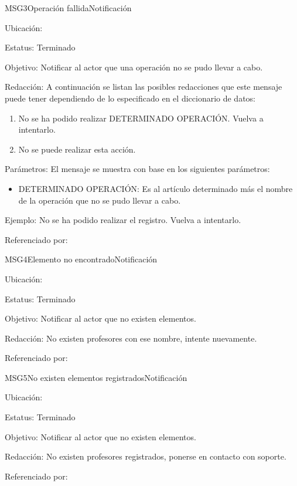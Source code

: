 \begin{mensaje}{MSG3}{Operación fallida}{Notificación}
	\item[Ubicación:] \msjEmergente
	\item[Estatus:] Terminado
	\item[Objetivo:] Notificar al actor que una operación no se pudo llevar a cabo.
	\item[Redacción:] A continuación se listan las posibles redacciones que este mensaje puede tener dependiendo de lo especificado en el diccionario de datos:
	\begin{enumerate}
		\item No se ha podido realizar DETERMINADO OPERACIÓN. Vuelva a intentarlo.
		\item No se puede realizar esta acción.
	\end{enumerate}

	\item[Parámetros:] El mensaje se muestra con base en los siguientes parámetros:
	\begin{itemize}
		\item DETERMINADO OPERACIÓN: Es al artículo determinado más el nombre de la operación que no se pudo llevar a cabo.
	\end{itemize}
	\item[Ejemplo:] No se ha podido realizar el registro. Vuelva a intentarlo.
	\item[Referenciado por:] 
\end{mensaje}


\begin{mensaje}{MSG4}{Elemento no encontrado}{Notificación}
	\item[Ubicación:] \msjEmergente
	\item[Estatus:] Terminado
	\item[Objetivo:] Notificar al actor que no existen elementos.
	\item[Redacción:] No existen profesores con ese nombre, intente nuevamente.
	\item[Referenciado por:] 
\end{mensaje}

\begin{mensaje}{MSG5}{No existen elementos registrados}{Notificación}
	\item[Ubicación:] \msjEmergente
	\item[Estatus:] Terminado
	\item[Objetivo:] Notificar al actor que no existen elementos.
	\item[Redacción:] No existen profesores registrados, ponerse en contacto con soporte.
	\item[Referenciado por:] 
\end{mensaje}
